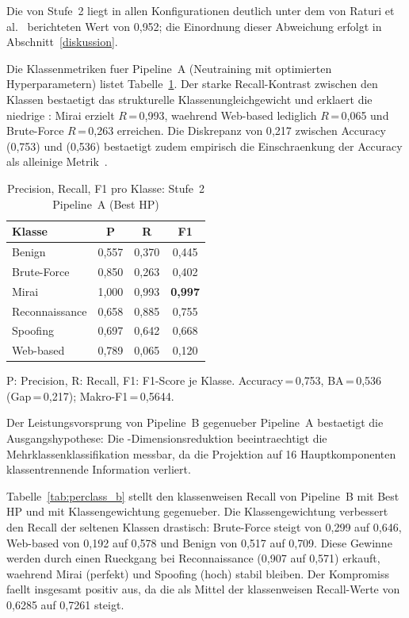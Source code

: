 Die \ba{} von Stufe~2 liegt in allen Konfigurationen deutlich unter dem von Raturi et al.\
\cite{raturi2026exploratory} berichteten Wert von 0{,}952; die Einordnung dieser Abweichung
erfolgt in Abschnitt~\ref{diskussion}.

Die Klassenmetriken fuer Pipeline~A (Neutraining mit optimierten Hyperparametern) listet
Tabelle~\ref{tab:perclass_a}.
Der starke Recall-Kontrast zwischen den Klassen bestaetigt das strukturelle
Klassenungleichgewicht und erklaert die niedrige \ba{}:
Mirai erzielt $R$\,=\,0{,}993, waehrend Web-based lediglich $R$\,=\,0{,}065 und Brute-Force
$R$\,=\,0{,}263 erreichen.
Die Diskrepanz von 0{,}217 zwischen Accuracy (0{,}753) und \ba{} (0{,}536) bestaetigt zudem
empirisch die Einschraenkung der Accuracy als alleinige Metrik~\cite{hosseini2025imbalance}.

\begin{table}[h]
\centering
\caption{Precision, Recall, F1 pro Klasse: Stufe~2 Pipeline~A (Best HP)}
\label{tab:perclass_a}
\begin{tabular}{lccc}
\toprule
Klasse & P & R & F1 \\
\midrule
Benign       & 0{,}557 & 0{,}370 & 0{,}445 \\
Brute-Force  & 0{,}850 & 0{,}263 & 0{,}402 \\
Mirai        & 1{,}000 & 0{,}993 & \textbf{0{,}997} \\
Reconnaissance & 0{,}658 & 0{,}885 & 0{,}755 \\
Spoofing     & 0{,}697 & 0{,}642 & 0{,}668 \\
Web-based    & 0{,}789 & 0{,}065 & 0{,}120 \\
\bottomrule
\end{tabular}
\smallskip\newline
{\footnotesize P: Precision, R: Recall, F1: F1-Score je Klasse.
Accuracy\,=\,0{,}753, BA\,=\,0{,}536 (Gap\,=\,0{,}217); Makro-F1\,=\,0{,}5644.}
\end{table}

Der Leistungsvorsprung von Pipeline~B gegenueber Pipeline~A bestaetigt die Ausgangshypothese:
Die \pca{}-Dimensionsreduktion beeintraechtigt die Mehrklassenklassifikation messbar, da die
Projektion auf 16 Hauptkomponenten klassentrennende Information verliert.

Tabelle~\ref{tab:perclass_b} stellt den klassenweisen Recall von Pipeline~B mit Best HP
und mit Klassengewichtung gegenueber.
Die Klassengewichtung verbessert den Recall der seltenen Klassen drastisch:
Brute-Force steigt von 0{,}299 auf 0{,}646, Web-based von 0{,}192 auf 0{,}578 und
Benign von 0{,}517 auf 0{,}709.
Diese Gewinne werden durch einen Rueckgang bei Reconnaissance (0{,}907 auf 0{,}571)
erkauft, waehrend Mirai (perfekt) und Spoofing (hoch) stabil bleiben.
Der Kompromiss faellt insgesamt positiv aus, da die \ba{} als Mittel der
klassenweisen Recall-Werte von 0{,}6285 auf 0{,}7261 steigt.

